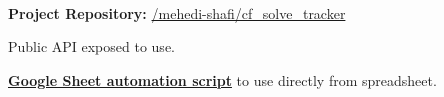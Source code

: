  \\
\vspace{\topsep}
{\bf Project Repository: }\href{https://github.com/mehedi-shafi/cf_solve_tracker}{\github/mehedi-shafi/cf\_solve\_tracker}
\vspace{\topsep}

\begin{tightitemize}

\item Public API exposed to use.
\item \href{https://gist.github.com/mehedi-shafi/0347e59d54f2a198fc12dca167394f43}{\bf Google Sheet automation script} to use directly from spreadsheet.

\end{tightitemize}

\sectionspace
